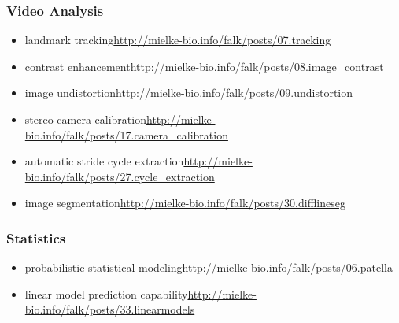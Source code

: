 \begin{change}
\subsubsection{Video Analysis}
\label{sec:orgb1be80c}
\begin{itemize}
\item landmark tracking\newline \url{http://mielke-bio.info/falk/posts/07.tracking}
\item contrast enhancement\newline \url{http://mielke-bio.info/falk/posts/08.image\_contrast}
\item image undistortion\newline \url{http://mielke-bio.info/falk/posts/09.undistortion}
\item stereo camera calibration\newline \url{http://mielke-bio.info/falk/posts/17.camera\_calibration}
\item automatic stride cycle extraction\newline \url{http://mielke-bio.info/falk/posts/27.cycle\_extraction}
\item image segmentation\newline \url{http://mielke-bio.info/falk/posts/30.difflineseg}
\end{itemize}
\subsubsection{Statistics}
\label{sec:orgc0b5489}
\begin{itemize}
\item probabilistic statistical modeling\newline \url{http://mielke-bio.info/falk/posts/06.patella}
\item linear model prediction capability\newline \url{http://mielke-bio.info/falk/posts/33.linearmodels}
\end{itemize}

\end{change}
